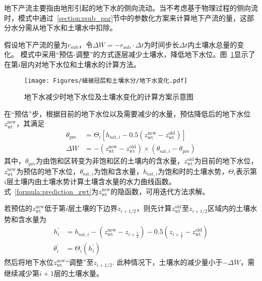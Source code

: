 地下产流主要指由地形引起的地下水的侧向流动。当不考虑基于物理过程的侧向流时，模式中通过~\ref{section:rsub_par}节中的参数化方案来计算地下产流的量，这部分水分需从地下水和土壤水中扣除。

假设地下产流的量为$r_{\mathrm{sub}}$，令$\Delta W=-r_{\mathrm{sub}}\cdot \Delta t$为时间步长$\Delta t$内土壤水总量的变化。 模式中采用“预估-调整”的方式逐层减少土壤水，降低地下水位。图~\ref{fig:地下水变化}显示了在第$i$层内对地下水位和土壤水的计算方法。

{
  \begin{figure}[htbp]
    \centering
    \texttt{[image: Figures/植被冠层和土壤水分/地下水变化.pdf]}
    \caption{地下水减少时地下水位及土壤水变化的计算方案示意图}
    \label{fig:地下水变化}
  \end{figure}
}

在“预估”步，根据目前的地下水位以及需要减少的水量，预估降低后的地下水位$z_{\mathrm{wt}}^{\mathrm{new}}$，其满足
\begin{equation} \label{formula:prediction_zwt}
  \begin{aligned}
    \theta_{\mathrm{pre}} & = \Theta_i\left[h_{\mathrm{sat},i} - 0.5\left(z_{\mathrm{wt}}^{\mathrm{new}} - z_{\mathrm{wt}}^{\mathrm{old}}\right)\right] \\
    \Delta W & = - \left(z_{\mathrm{wt}}^{\mathrm{new}} - z_{\mathrm{wt}}^{\mathrm{old}}\right) \times  \left(\theta_{\mathrm{sat},i} - \theta_{\mathrm{pre}}\right)
  \end{aligned}
\end{equation}
其中，$\theta_{\mathrm{pre}}$为由饱和区转变为非饱和区的土壤内的含水量，$z_{\mathrm{wt}}^{\mathrm{old}}$为目前的地下水位，$z_{\mathrm{wt}}^{\mathrm{new}}$为预估的地下水位，$\theta_{\mathrm{sat},i}$为饱和含水量，$h_{\mathrm{sat},i}$为饱和时的土壤水势，$\Theta_i$表示第$i$层土壤内由土壤水势计算土壤含水量的水力曲线函数。式~\eqref{formula:prediction_zwt}为$z_{\mathrm{wt}}^{\mathrm{new}}$的隐函数，可用迭代方法求解。

若预估的$z_{\mathrm{wt}}^{\mathrm{new}}$低于第$i$层土壤的下边界$z_{i+1/2}$，则先计算$z_{\mathrm{wt}}^{\mathrm{old}}$至$z_{i+1/2}$区域内的土壤水势和含水量为
\begin{equation} \label{formula:adjust_zwt1}
  \begin{aligned}
    h_i^{\prime} & = h_{\mathrm{sat},i} - \left(z_{\mathrm{wt}}^{\mathrm{new}} - z_{i+\frac{1}{2}}\right) -0.5\left( z_{i+\frac{1}{2}} - z_{\mathrm{wt}}^{\mathrm{old}}\right) \\
    \theta_i^{\prime} & = \Theta_i\left(h_i^{\prime}\right)
  \end{aligned}
\end{equation}
然后将地下水位$z_{\mathrm{wt}}^{\mathrm{new}}$“调整”至$z_{i+1/2}$. 此种情况下，土壤水的减少量小于$- \Delta W$，需继续减少第$i+1$层的土壤水量。

